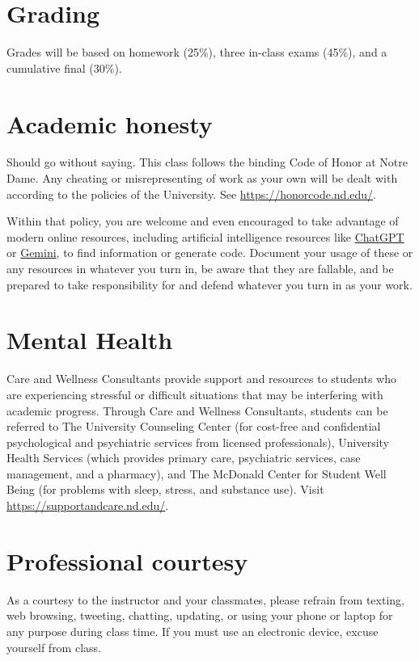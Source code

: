 \documentclass[11pt]{article}
\begin{document}
\section{Grading}
\label{sec:org22cd95e}
Grades will be based on homework (25\%), three in-class exams (45\%), and a cumulative final (30\%).
\section{Academic honesty}
\label{sec:org41b2442}
Should go without saying. This class follows the binding Code of Honor at Notre Dame.  Any cheating or misrepresenting of work as your own will be dealt with according to the policies of the University.  See \url{https://honorcode.nd.edu/}.

Within that policy, you are welcome and even encouraged to take advantage of modern online resources, including artificial intelligence resources like \href{https://chatgpt.comm}{ChatGPT} or \href{https://gemini.google.com/app}{Gemini}, to find information or generate code. Document your usage of these or any resources in whatever you turn in, be aware that they are fallable, and be prepared to take responsibility for and defend whatever you turn in as your work.
\section{Mental Health}
\label{sec:org1b245d1}
Care and Wellness Consultants provide
support and resources to students who are experiencing stressful or difficult
situations that may be interfering with academic progress. Through Care and
Wellness Consultants, students can be referred to The University Counseling
Center (for cost-free and confidential psychological and psychiatric services from
licensed professionals), University Health Services (which provides primary care,
psychiatric services, case management, and a pharmacy), and The McDonald
Center for Student Well Being (for problems with sleep, stress, and substance
use). Visit \href{https://supportandcare.nd.edu/}{https://supportandcare.nd.edu/}.
\section{Professional courtesy}
\label{sec:orgeec460c}
As a courtesy to the instructor and your classmates, please refrain from
texting, web browsing, tweeting, chatting, updating, or using your phone or laptop for any
purpose during class time.  If you must use an electronic device, excuse
yourself from class.
\end{document}
